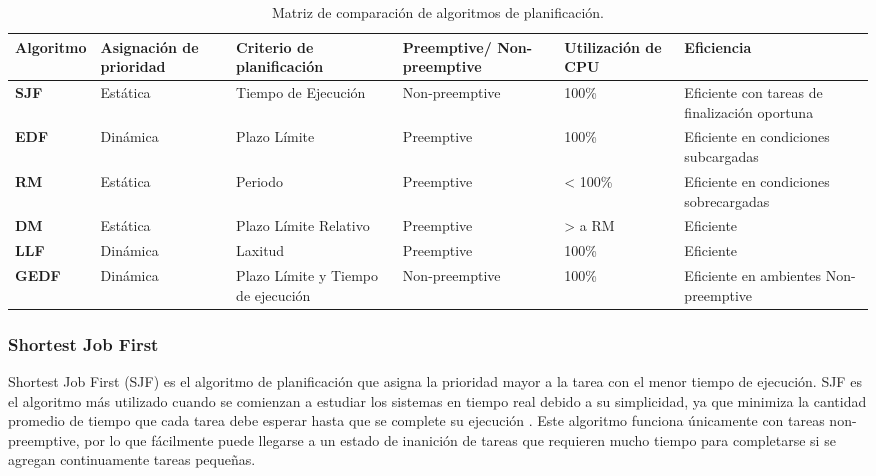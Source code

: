     
        \begin{table}[h!]
      \begin{center}
            \scriptsize
        \begin{tabular}{|m{1.5cm}|m{2cm}|m{2cm}|m{2cm}|m{2cm}|m{3cm}|}
         \hline
        \cellcolor{lightgray}\textbf{Algoritmo} & \cellcolor{lightgray} \textbf{Asignación de prioridad} & \cellcolor{lightgray} \textbf{Criterio de planificación} & \cellcolor{lightgray} \textbf{Preemptive/ Non-preemptive} & \cellcolor{lightgray} \textbf{Utilización de CPU} & \cellcolor{lightgray} \textbf{Eficiencia}  \\ 
         \hline
          \textbf{SJF} & Estática & Tiempo de Ejecución & Non-preemptive & 100\% & Eficiente con tareas de finalización oportuna \\
         \hline
         \textbf{EDF} & Dinámica & Plazo Límite & Preemptive & 100\% & Eficiente en condiciones subcargadas \\
         \hline 
         \textbf{RM} & Estática & Periodo & Preemptive & < 100\% & Eficiente en condiciones sobrecargadas \\
         \hline
          \textbf{DM} & Estática & Plazo Límite Relativo & Preemptive & > a RM & Eficiente \\
         \hline
          \textbf{LLF} & Dinámica & Laxitud & Preemptive & 100\% & Eficiente \\
         \hline
          \textbf{GEDF} & Dinámica & Plazo Límite y Tiempo de ejecución & Non-preemptive & 100\%& Eficiente en ambientes Non-preemptive \\
         \hline
                \end{tabular}
        \caption{Matriz de comparación de algoritmos de planificación.}
        \label{tab:algoTR}
      \end{center}
    \end{table}
    
    \subsubsection{Shortest Job First}
    Shortest Job First (SJF) es el algoritmo de planificación que asigna la prioridad mayor a la tarea con el menor tiempo de ejecución. SJF es el algoritmo más utilizado cuando se comienzan a estudiar los sistemas en tiempo real debido a su simplicidad, ya que minimiza la cantidad promedio de tiempo que cada tarea debe esperar hasta que se complete su ejecución \cite{Tanenbaum}. Este algoritmo funciona únicamente con tareas non-preemptive, por lo que fácilmente puede llegarse a un estado de inanición de tareas que requieren mucho tiempo para completarse si se agregan continuamente tareas pequeñas.
    
